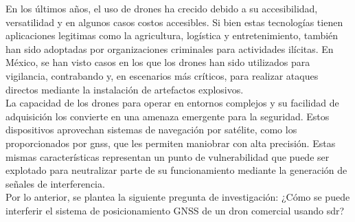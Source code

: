 
\begin{justify}
    En los últimos años, el uso de drones ha crecido debido a su accesibilidad, versatilidad y en algunos casos costos accesibles.
    Si bien estas tecnologías tienen aplicaciones legitimas como la agricultura, logística y entretenimiento,
    también han sido adoptadas por organizaciones criminales para actividades ilícitas. En México, 
    se han visto casos en los que los drones han sido utilizados para vigilancia, contrabando y,
    en escenarios más críticos, para realizar ataques directos mediante la instalación de artefactos explosivos.\\ 

    \noindent La capacidad de los drones para operar en entornos complejos y su facilidad de adquisición los convierte
    en una amenaza emergente para la seguridad. Estos dispositivos aprovechan sistemas de navegación por satélite,
    como los proporcionados por \gls{gnss}, que les permiten maniobrar con alta precisión.
    Estas mismas características representan un punto de vulnerabilidad que puede ser explotado para neutralizar parte de su
    funcionamiento mediante la generación de señales de interferencia.\\

    \noindent Por lo anterior, se plantea la siguiente pregunta de investigación:
    ¿Cómo se puede interferir el sistema de posicionamiento GNSS de un dron comercial usando \gls{sdr}?
\end{justify}